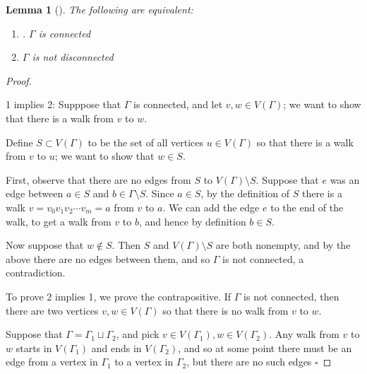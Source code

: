 \documentclass[10pt,]{book}
\theoremstyle{plain}
\newtheorem{lemma}[theorem]{Lemma}
\theoremstyle{definition}
\theoremstyle{definition}
\theoremstyle{definition}
\begin{document}
\begin{lemma}[{}]\label{lemma-1}
\hypertarget{p-83}{}%
The following are equivalent:%
\leavevmode%
\begin{enumerate}
\item\hypertarget{li-20}{}. \(\Gamma\) is connected%
\item\hypertarget{li-21}{}\(\Gamma\) is not disconnected%
\end{enumerate}
\end{lemma}
\begin{proof}\hypertarget{proof-2}{}
\hypertarget{p-84}{}%
1 implies 2: Supppose that \(\Gamma\) is connected, and let \(v, w\in V(\Gamma)\); we want to show that there is a walk from \(v\) to \(w\).%
\par
\hypertarget{p-85}{}%
Define \(S\subset V(\Gamma)\) to be the set of all vertices \(u\in V(\Gamma)\) so that there is a walk from \(v\) to \(u\); we want to show that \(w\in S\).%
\par
\hypertarget{p-86}{}%
First, observe that there are no edges from \(S\) to \(V(\Gamma)\setminus S\).  Suppose that \(e\) was an edge between \(a\in S\) and \(b\in\Gamma\setminus S\).  Since \(a\in S\), by the definition of \(S\) there is a walk \(v=v_0v_1v_2\cdots v_m=a\) from \(v\) to \(a\).  We can add the edge \(e\) to the end of the walk, to get a walk from \(v\) to \(b\), and hence by definition \(b\in S\).%
\par
\hypertarget{p-87}{}%
Now suppose that \(w\notin S\).  Then \(S\) and \(V(\Gamma)\setminus S\) are both nonempty, and by the above there are no edges between them, and so \(\Gamma\) is not connected, a contradiction.%
\par
\hypertarget{p-88}{}%
To prove 2 implies 1, we prove the contrapositive.  If \(\Gamma\) is not connected, then there are two vertices \(v,w\in V(\Gamma)\) so that there is no walk from \(v\) to \(w\).%
\par
\hypertarget{p-89}{}%
Suppose that \(\Gamma=\Gamma_1\sqcup\Gamma_2\), and pick \(v\in V(\Gamma_1), w\in V(\Gamma_2)\).  Any walk from \(v\) to \(w\) starts in \(V(\Gamma_1)\) and ends in \(V(\Gamma_2)\), and so at some point there must be an edge from a vertex in \(\Gamma_1\) to a vertex in \(\Gamma_2\), but there are no such edges \(\square\)%
\end{proof}
\typeout{************************************************}
\typeout{************************************************}
\end{document}
